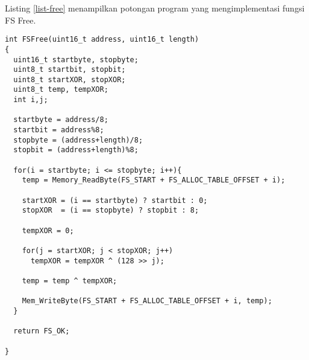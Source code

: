 Listing \ref{list-free} menampilkan potongan program yang mengimplementasi fungsi FS Free.

\begin{lstlisting}[caption={Listing Program Fungsi FS Free}, label={list-free}]
int FSFree(uint16_t address, uint16_t length)
{
  uint16_t startbyte, stopbyte;
  uint8_t startbit, stopbit;
  uint8_t startXOR, stopXOR;
  uint8_t temp, tempXOR;
  int i,j;

  startbyte = address/8;
  startbit = address%8;
  stopbyte = (address+length)/8;
  stopbit = (address+length)%8;

  for(i = startbyte; i <= stopbyte; i++){
    temp = Memory_ReadByte(FS_START + FS_ALLOC_TABLE_OFFSET + i);

    startXOR = (i == startbyte) ? startbit : 0;
    stopXOR  = (i == stopbyte) ? stopbit : 8;

    tempXOR = 0;

    for(j = startXOR; j < stopXOR; j++)
      tempXOR = tempXOR ^ (128 >> j);

    temp = temp ^ tempXOR;

    Mem_WriteByte(FS_START + FS_ALLOC_TABLE_OFFSET + i, temp);
  }

  return FS_OK;

}
\end{lstlisting}
